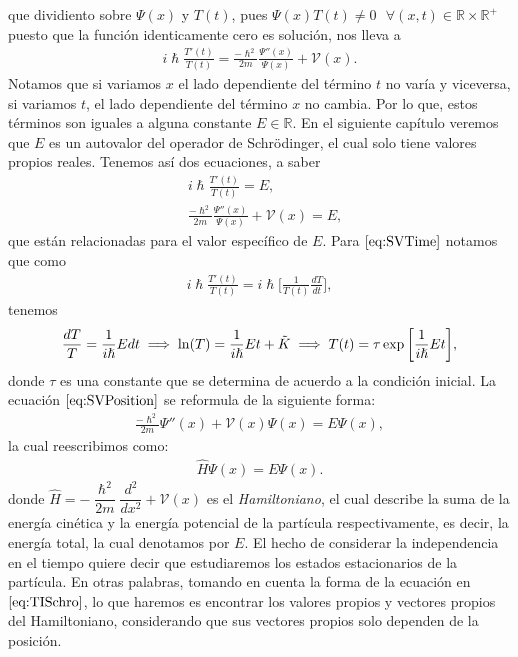 \documentclass[12pt]{article}
\theoremstyle{definition}
\newcommand*{\field}[1]{\mathbb{#1}}
\begin{document}
que dividiento sobre $\Psi(x)$ y $T(t)$, pues $\Psi(x)T(t)\neq 0\:\:\:\forall (x,t)\in \field{R}\times\field{R}^{+}$ puesto que la función identicamente cero es solución, nos lleva a
\begin{align*}
    i\hslash \frac{T'(t) }{T(t)} = \frac{-\hslash ^2 }{2m}\frac{\Psi''(x)}{\Psi(x)} + \mathcal{V}(x).
\end{align*}
Notamos que si variamos $x$ el lado dependiente del término $t$ no varía y viceversa, si variamos $t$, el lado dependiente del término $x$ no cambia. Por lo que, estos términos son iguales a alguna constante $E \in \field{R}$. En el siguiente capítulo veremos que $E$ es un autovalor del operador de Schrödinger, el cual solo tiene valores propios reales. Tenemos así dos ecuaciones, a saber
\begin{align}
    & i\hslash \frac{T'(t) }{T(t)} = E,
    \label{eq:SVTime}
    \\
    & \frac{-\hslash ^2 }{2m}\frac{\Psi''(x)}{\Psi(x)} + \mathcal{V}(x) = E,
    \label{eq:SVPosition}
\end{align}
que están relacionadas para el valor específico de $E$.
Para $\eqref{eq:SVTime}$ notamos que como
\begin{align*}
     i\hslash \frac{T'(t) }{T(t)} = i\hslash \bigg[\frac{1}{T(t)}\frac{dT}{dt}\bigg],
\end{align*}
tenemos
\begin{align}
     \frac{dT}{T} = \frac{1}{i\hslash}E dt
     \implies
     \ln(T) = \frac{1}{i\hslash}E t + \Tilde{K}
     \implies T(t) = \tau\exp\bigg[\frac{1}{i\hslash}E t\bigg],
     \label{eq:TimeSep}
\end{align}
donde $\tau$ es una constante que se determina de acuerdo a la condición inicial. La ecuación  $\eqref{eq:SVPosition}$ se reformula de la siguiente forma:
\begin{align*}                           \frac{-\hslash^2}{2m}\Psi''(x) + \mathcal{V}(x)\Psi(x) = E \Psi(x),
\end{align*}
la cual reescribimos como:
\begin{align}
    \hat{H} \Psi(x) = E \Psi(x).
    \label{eq:TISchro}
\end{align}
donde $\hat{H} = - \dfrac{\hslash^2}{2m}\dfrac{d^2}{dx^2} + \mathcal{V}(x)$ es el \textit{Hamiltoniano}, el cual describe la suma de la energía cinética y la energía potencial de la partícula respectivamente, es decir, la energía total, la cual denotamos por $E$. El hecho de considerar la independencia en el tiempo quiere decir que estudiaremos los estados estacionarios de la partícula. En otras palabras, tomando en cuenta la forma de la ecuación en $\eqref{eq:TISchro}$, lo que haremos es encontrar los valores propios y vectores propios del Hamiltoniano, considerando que sus vectores propios solo dependen de la posición.
\end{document}
